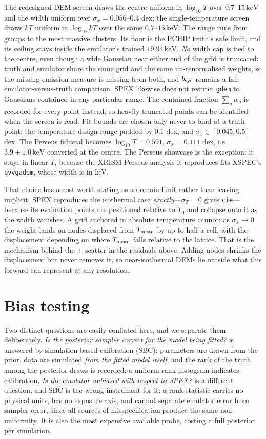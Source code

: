 \documentclass[11pt,a4paper]{article}
\newcommand{\kev}{\,\mathrm{keV}}
\newcommand{\code}[1]{\texttt{#1}}
\begin{document}
The redesigned DEM screen draws the centre uniform in $\log_{10}T$ over
$0.7$--$15\kev$ and the width uniform over $\sigma_x=0.056$--$0.4$ dex; the
single-temperature screen draws $kT$ uniform in $\log_{10}kT$ over the same
$0.7$--$15\kev$. The range runs from groups to the most massive clusters. Its
floor is the PCHIP truth's safe limit, and its ceiling stays inside the
emulator's trained $19.94\kev$. \emph{No} width cap is tied to the centre, even
though a wide Gaussian near either end of the grid is truncated: truth and
emulator share the same grid and the same un-renormalised weights, so the
missing emission measure is missing from both, and $b_{\rm sys}$ remains a fair
emulator-versus-truth comparison. SPEX likewise does not restrict \code{gdem}
to Gaussians contained in any particular range. The contained fraction
$\sum_g w_g$ is recorded for every point instead, so heavily truncated points
can be identified when the screen is read. Fit bounds are chosen only never to
bind at a truth point: the temperature design range padded by $0.1$ dex, and
$\sigma_x\in[0.045, 0.5]$ dex. The Perseus fiducial becomes
$\log_{10}T=0.591$, $\sigma_x=0.111$ dex, i.e.\ $3.9\pm1.0\kev$ converted at the
centre. The Perseus showcase is the exception: it stays in linear $T$, because
the XRISM Perseus analysis it reproduces fits XSPEC's \code{bvvgadem}, whose
width is in keV.

That choice has a cost worth stating as a domain limit rather than leaving
implicit. SPEX reproduces the isothermal case \emph{exactly}---$\sigma_T=0$
gives \code{cie}---because its evaluation points are positioned relative to
$T_0$ and collapse onto it as the width vanishes. A grid anchored in absolute
temperature cannot: as $\sigma_x\to0$ the weight lands on nodes displaced from
$T_{\rm mean}$ by up to half a cell, with the displacement depending on where
$T_{\rm mean}$ falls relative to the lattice. That is the mechanism behind the
$\pm$ scatter in the residuals above. Adding nodes shrinks the displacement but
never removes it, so near-isothermal DEMs lie outside what this forward can
represent at any resolution.

\section{Bias testing}
Two distinct questions are easily conflated here, and we separate them
deliberately. \emph{Is the posterior sampler correct for the model being
fitted?} is answered by simulation-based calibration (SBC): parameters are drawn
from the prior, data are simulated \emph{from the fitted model itself}, and the
rank of the truth among the posterior draws is recorded; a uniform rank
histogram indicates calibration. \emph{Is the emulator unbiased with respect to
SPEX?} is a different question, and SBC is the wrong instrument for it: a rank
statistic carries no physical units, has no exposure axis, and cannot separate
emulator error from sampler error, since all sources of misspecification produce
the same non-uniformity. It is also the most expensive available probe, costing
a full posterior per simulation.
\end{document}
